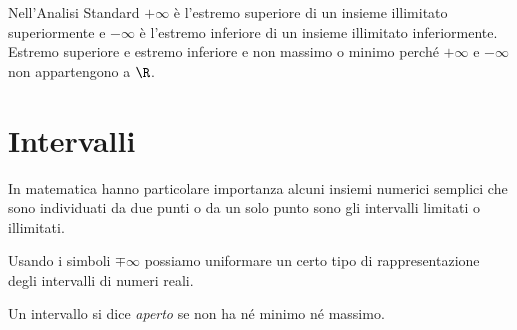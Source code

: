 \vspace{.5em}
Nell'Analisi Standard \(+\infty\) è l'estremo superiore di un insieme 
illimitato superiormente e \(-\infty\) è l'estremo inferiore di un insieme 
illimitato inferiormente.
Estremo superiore e estremo inferiore e non massimo o minimo perché \(+\infty\) 
e \(-\infty\) non appartengono a \(\R\).

\section{Intervalli}
\label{sec:topologiaintervalli}

% 
% 

In matematica hanno particolare importanza alcuni insiemi numerici semplici 
che sono individuati da due punti o da un solo punto sono gli intervalli 
limitati o illimitati.


Usando i simboli \(\mp \infty\) possiamo uniformare un certo tipo di 
rappresentazione degli intervalli di numeri reali.

\begin{newdef}{}{}
Un intervallo si dice \emph{aperto} se non ha né minimo né massimo.
\end{newdef}


